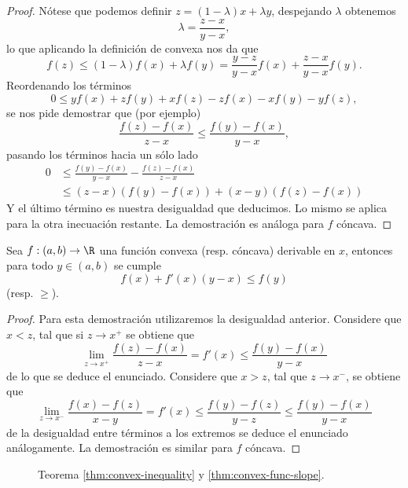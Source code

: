 \documentclass[11pt,oneside,a4paper]{book}
\begin{document}
\begin{proof}
Nótese que podemos definir $z=(1-\lambda)x+\lambda y$, despejando $\lambda$ obtenemos
$$\lambda=\frac{z-x}{y-x},$$
lo que aplicando la definición de convexa nos da que
$$f(z)\leq(1-\lambda)f(x)+\lambda f(y)=\frac{y-z}{y-x}f(x)+\frac{z-x}{y-x}f(y).$$
Reordenando los términos
$$0\leq yf(x)+zf(y)+xf(z)-zf(x)-xf(y)-yf(z),$$
se nos pide demostrar que (por ejemplo)
$$\frac{f(z)-f(x)}{z-x}\leq\frac{f(y)-f(x)}{y-x},$$
pasando los términos hacia un sólo lado
\begin{align*}
0&\leq\frac{f(y)-f(x)}{y-x}-\frac{f(z)-f(x)}{z-x}\\
&\leq(z-x)(f(y)-f(x))+(x-y)(f(z)-f(x))
\end{align*}
Y el último término es nuestra desigualdad que deducimos. Lo mismo se aplica para la otra inecuación restante. La demostración es análoga para $f$ cóncava.
\end{proof}
\begin{thm}\label{thm:convex-func-slope}
Sea $f:(a,b)\rightarrow\R$ una función convexa (resp. cóncava) derivable en $x$, entonces para todo $y\in(a,b)$ se cumple
$$f(x)+f'(x)(y-x)\leq f(y)$$
(resp. $\geq$).
\end{thm}
\begin{proof}
Para esta demostración utilizaremos la desigualdad anterior. Considere que $x\lt z$, tal que si $z\to x^+$ se obtiene que
$$\lim_{z\to x^+}\frac{f(z)-f(x)}{z-x}=f'(x)\leq\frac{f(y)-f(x)}{y-x}$$
de lo que se deduce el enunciado. Considere que $x\gt z$, tal que $z\to x^-$, se obtiene que
$$\lim_{z\to x^-}\frac{f(x)-f(z)}{x-y}=f'(x)\leq\frac{f(y)-f(z)}{y-z}\leq\frac{f(y)-f(x)}{y-x}$$
de la desigualdad entre términos a los extremos se deduce el enunciado análogamente. La demostración es similar para $f$ cóncava.
\end{proof}
\begin{figure}
\centering
{}
\caption{Teorema \ref{thm:convex-inequality} y \ref{thm:convex-func-slope}.}
\end{figure}
\end{document}
